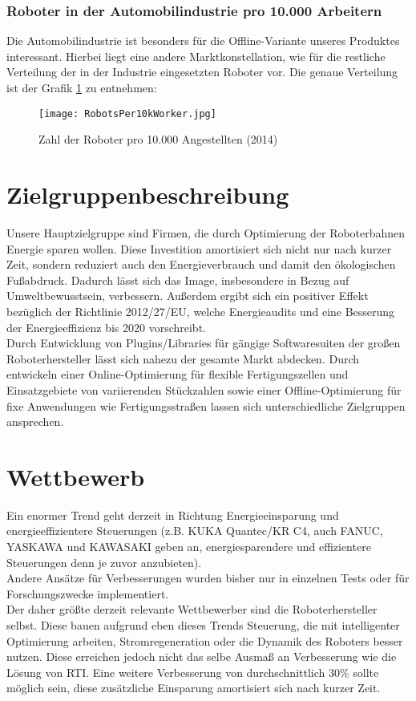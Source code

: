 \subsubsection{Roboter in der Automobilindustrie pro 10.000 Arbeitern}
Die Automobilindustrie ist besonders für die Offline-Variante unseres Produktes interessant. Hierbei liegt eine andere Marktkonstellation, wie für die restliche Verteilung der in der Industrie eingesetzten Roboter vor. Die genaue Verteilung ist der Grafik \ref{fig:RobotsPer10kWorker} zu entnehmen:
\begin{figure}[h]
	\centering
	\texttt{[image: RobotsPer10kWorker.jpg]}
	\caption{Zahl der Roboter pro 10.000 Angestellten (2014)}
	\label{fig:RobotsPer10kWorker}
\end{figure}

\section{Zielgruppenbeschreibung}
Unsere Hauptzielgruppe sind Firmen, die durch Optimierung der Roboterbahnen Energie sparen wollen. Diese Investition amortisiert sich nicht nur nach kurzer Zeit, sondern reduziert auch den Energieverbrauch und damit den ökologischen Fußabdruck. Dadurch lässt sich das Image, insbesondere in Bezug auf Umweltbewusstsein, verbessern. Außerdem ergibt sich ein positiver Effekt bezüglich der Richtlinie 2012/27/EU, welche Energieaudits und eine Besserung der Energieeffizienz bis 2020 vorschreibt.\\
Durch Entwicklung von Plugins/Libraries für gängige Softwaresuiten der großen Roboterhersteller lässt sich nahezu der gesamte Markt abdecken. Durch entwickeln einer Online-Optimierung für flexible Fertigungszellen und Einsatzgebiete von variierenden Stückzahlen sowie einer Offline-Optimierung für fixe Anwendungen wie Fertigungsstraßen lassen sich unterschiedliche Zielgruppen ansprechen. 

\section{Wettbewerb}
Ein enormer Trend geht derzeit in Richtung Energieeinsparung und energieeffizientere Steuerungen (z.B. KUKA Quantec/KR C4, auch FANUC, YASKAWA und KAWASAKI geben an, energiesparendere und effizientere Steuerungen denn je zuvor anzubieten).\\
Andere Ansätze für Verbesserungen wurden bisher nur in einzelnen Tests oder für Forschungszwecke implementiert.\\
Der daher größte derzeit relevante Wettbewerber sind die Roboterhersteller selbst. Diese bauen aufgrund eben dieses Trends Steuerung, die mit intelligenter Optimierung arbeiten, Stromregeneration oder die Dynamik des Roboters besser nutzen. Diese erreichen jedoch nicht das selbe Ausmaß an Verbesserung wie die Lösung von RTI. Eine weitere Verbesserung von durchschnittlich $30$\% sollte möglich sein, diese zusätzliche Einsparung amortisiert sich nach kurzer Zeit.


